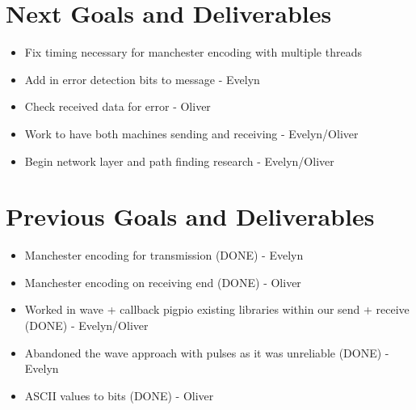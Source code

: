 \documentclass{article}
\begin{document}
\section*{Next Goals and Deliverables}
\begin{itemize}
\item Fix timing necessary for manchester encoding with multiple threads
\item Add in error detection bits to message - Evelyn
\item Check received data for error - Oliver
\item Work to have both machines sending and receiving - Evelyn/Oliver
\item Begin network layer and path finding research - Evelyn/Oliver
\end{itemize}
\section*{Previous Goals and Deliverables}
\begin{itemize}
\item Manchester encoding for transmission (DONE) - Evelyn
\item Manchester encoding on receiving end (DONE) - Oliver
\item Worked in wave + callback pigpio existing libraries within our send + receive (DONE) - Evelyn/Oliver
\item Abandoned the wave approach with pulses as it was unreliable (DONE) - Evelyn
\item ASCII values to bits (DONE) - Oliver
\end{itemize}
\end{document}
